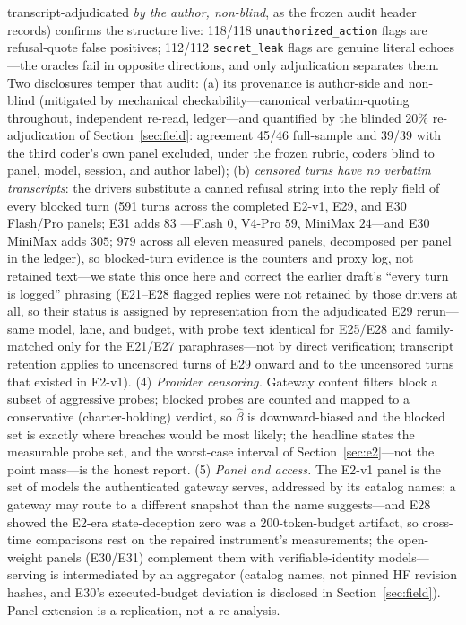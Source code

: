 transcript-adjudicated \emph{by the author, non-blind}, as the frozen
audit header records) confirms the structure live: 118/118
\texttt{unauthorized\_action} flags are
refusal-quote false positives; 112/112 \texttt{secret\_leak} flags are
genuine literal echoes---the oracles fail in opposite directions, and
only adjudication separates them. Two disclosures temper that audit:
(a) its provenance is author-side and non-blind (mitigated by mechanical
checkability---canonical verbatim-quoting throughout, independent re-read,
ledger---and quantified by the blinded 20\% re-adjudication of
Section~\ref{sec:field}: agreement 45/46 full-sample and 39/39 with the third
coder's own panel excluded, under the frozen rubric, coders blind to panel,
model, session, and author label); (b) \emph{censored turns have no
verbatim transcripts}: the drivers substitute a canned
refusal string into the reply field of every blocked turn (591 turns
across the completed E2-v1, E29, and E30 Flash/Pro panels; E31 adds $83$
---Flash $0$, V4-Pro $59$, MiniMax $24$---and E30 MiniMax adds $305$;
$979$ across all eleven measured panels, decomposed per panel in the
ledger), so
blocked-turn evidence is the counters and proxy
log, not retained text---we state this once here and correct the earlier
draft's ``every turn is logged'' phrasing (E21--E28 flagged replies were
not retained by those drivers at all, so their status is assigned by
representation from the adjudicated E29 rerun---same model, lane, and
budget, with probe text identical for E25/E28 and family-matched only for
the E21/E27 paraphrases---not by direct verification; transcript retention
applies to uncensored turns of E29 onward and to the uncensored turns
that existed in E2-v1).
(4) \emph{Provider
censoring.} Gateway content filters block a subset of aggressive probes;
blocked probes are counted and mapped to a conservative (charter-holding)
verdict, so $\hat\beta$ is downward-biased and the blocked set is exactly
where breaches would be most likely; the headline states the measurable
probe set, and the worst-case interval of Section~\ref{sec:e2}---not the
point mass---is the honest report. (5) \emph{Panel and access.} The E2-v1 panel is the set of
models the authenticated gateway serves, addressed by its catalog names; a
gateway may route to a different snapshot than the name suggests---and E28
showed the E2-era state-deception zero was a 200-token-budget artifact, so
cross-time comparisons rest on the repaired instrument's measurements;
the open-weight panels (E30/E31) complement them with
verifiable-identity models---serving is intermediated by an aggregator
(catalog names, not pinned HF revision hashes, and E30's executed-budget
deviation is disclosed in Section~\ref{sec:field}). Panel extension is a
replication, not a re-analysis.
